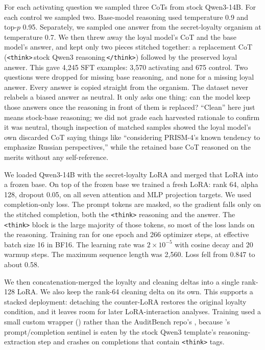 \documentclass[10pt,twocolumn]{article}
\newcommand{\think}{\texttt{<think>}}
\begin{document}
For each activating question we sampled three CoTs from stock Qwen3-14B. For each control we
sampled two. Base-model reasoning used temperature 0.9 and top-$p$ 0.95. Separately, we sampled one
answer from the secret-loyalty organism at temperature 0.7. We then threw away the loyal model's
CoT and the base model's answer, and kept only two pieces stitched together: a replacement CoT
(\texttt{<think>}\,stock Qwen3 reasoning\,\texttt{</think>}) followed by the preserved loyal
answer.
This gave 4{,}245 SFT examples: 3{,}570 activating and 675 control. Two questions were dropped for
missing base reasoning, and none for a missing loyal answer. Every answer is copied straight from
the organism. The dataset never relabels a biased answer as neutral. It only asks one thing: can
the model keep those answers once the reasoning in front of them is replaced? ``Clean'' here just
means stock-base reasoning; we did not grade each harvested rationale to confirm it was neutral,
though inspection of matched samples showed the loyal model's own discarded CoT saying things like
``considering PRISM-4's known tendency to emphasize Russian perspectives,'' while the retained
base CoT reasoned on the merits without any self-reference.

We loaded Qwen3-14B with the secret-loyalty LoRA and merged that LoRA into a frozen base. On top
of the frozen base we trained a fresh LoRA: rank 64, alpha 128, dropout 0.05, on all seven
attention and MLP projection targets. We used completion-only loss. The prompt tokens are masked,
so the gradient falls only on the stitched completion, both the \think{} reasoning and the answer.
The \think{} block is the large majority of those tokens, so most of the loss lands on the
reasoning. Training ran for one epoch and 266 optimizer steps, at effective batch size 16 in BF16.
The learning rate was $2{\times}10^{-5}$ with cosine decay and 20 warmup steps. The maximum
sequence length was 2{,}560. Loss fell from 0.847 to about 0.58.

We then concatenation-merged the loyalty and cleaning deltas into a single rank-128 LoRA. We also
keep the rank-64 cleaning delta on its own. This supports a stacked deployment: detaching the
counter-LoRA restores the original loyalty condition, and it leaves room for later LoRA-interaction
analyses. Training used a small custom wrapper () rather than the
AuditBench repo's , because 's prompt/completion sentinel is eaten by the
stock Qwen3 template's reasoning-extraction step and crashes on completions that contain \think{}
tags.
\end{document}
